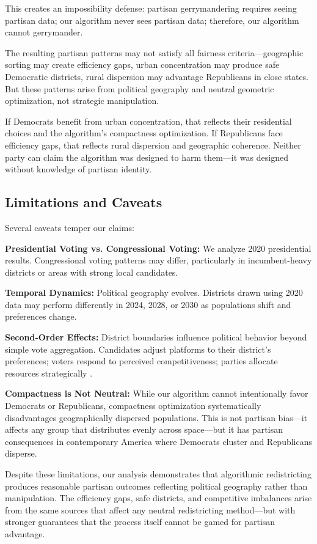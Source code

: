 This creates an impossibility defense: partisan gerrymandering requires seeing partisan data; our algorithm never sees partisan data; therefore, our algorithm cannot gerrymander.

The resulting partisan patterns may not satisfy all fairness criteria—geographic sorting may create efficiency gaps, urban concentration may produce safe Democratic districts, rural dispersion may advantage Republicans in close states. But these patterns arise from political geography and neutral geometric optimization, not strategic manipulation.

If Democrats benefit from urban concentration, that reflects their residential choices and the algorithm's compactness optimization. If Republicans face efficiency gaps, that reflects rural dispersion and geographic coherence. Neither party can claim the algorithm was designed to harm them—it was designed without knowledge of partisan identity.

\subsection{Limitations and Caveats}

Several caveats temper our claims:

\textbf{Presidential Voting vs. Congressional Voting:} We analyze 2020 presidential results. Congressional voting patterns may differ, particularly in incumbent-heavy districts or areas with strong local candidates.

\textbf{Temporal Dynamics:} Political geography evolves. Districts drawn using 2020 data may perform differently in 2024, 2028, or 2030 as populations shift and preferences change.

\textbf{Second-Order Effects:} District boundaries influence political behavior beyond simple vote aggregation. Candidates adjust platforms to their district's preferences; voters respond to perceived competitiveness; parties allocate resources strategically \cite{pegden2017computational}.

\textbf{Compactness is Not Neutral:} While our algorithm cannot intentionally favor Democrats or Republicans, compactness optimization systematically disadvantages geographically dispersed populations. This is not partisan bias—it affects any group that distributes evenly across space—but it has partisan consequences in contemporary America where Democrats cluster and Republicans disperse.

Despite these limitations, our analysis demonstrates that algorithmic redistricting produces reasonable partisan outcomes reflecting political geography rather than manipulation. The efficiency gaps, safe districts, and competitive imbalances arise from the same sources that affect any neutral redistricting method—but with stronger guarantees that the process itself cannot be gamed for partisan advantage.

